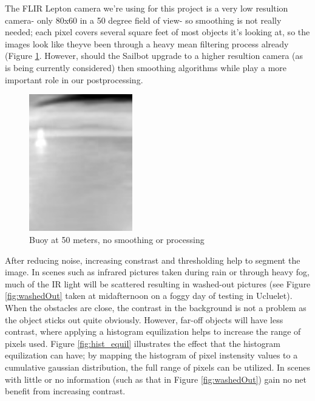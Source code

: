 The FLIR Lepton camera we're using for this project is a very low resultion camera- only 80x60 in a 50 degree field of view- so smoothing is not really needed; each pixel covers several square feet of most objects it's looking at, so the images look like theyve been through a heavy mean filtering process already (Figure \ref{fig:buoy_ex}. However, should the Sailbot upgrade to a higher resultion camera (as is being currently considered) then smoothing algorithms while play a more important role in our postprocessing. 

\begin{figure}
\centering
\includegraphics[width=0.4\textwidth]{"./image/buoy_example"}
\caption{Buoy at 50 meters, no smoothing or processing}
\label{fig:buoy_ex}
\end{figure}

After reducing noise, increasing constrast and thresholding help to segment the image. In scenes such as infrared pictures taken during rain or through heavy fog, much of the IR light will be scattered resulting in washed-out pictures (see Figure \ref{fig:washedOut} taken at midafternoon on a foggy day of testing in Ucluelet). When the obstacles are close, the contrast in the background is not a problem as the object sticks out quite obviously. However, far-off objects will have less contrast, where applying a histogram equilization helps to increase the range of pixels used. Figure \ref{fig:hist_equil} illustrates the effect that the histogram equilization can have; by mapping the histogram of pixel instensity values to a cumulative gaussian distribution, the full range of pixels can be utilized. In scenes with little or no information (such as that in Figure \ref{fig:washedOut}) gain no net benefit from increasing contrast.

